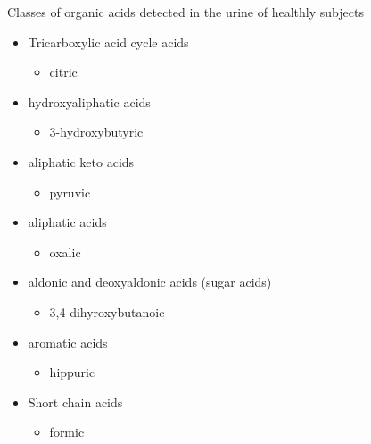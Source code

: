 \documentclass[presentation, smaller]{beamer}
\begin{document}
\begin{frame}[label={sec:orgheadline5}]{Classes of organic acids detected in the urine of  healthly subjects}
\begin{itemize}
\item Tricarboxylic acid cycle acids
\begin{itemize}
\item citric
\end{itemize}
\item hydroxyaliphatic acids
\begin{itemize}
\item 3-hydroxybutyric
\end{itemize}
\item aliphatic keto acids
\begin{itemize}
\item pyruvic
\end{itemize}
\item aliphatic acids
\begin{itemize}
\item oxalic
\end{itemize}
\item aldonic and deoxyaldonic acids (sugar acids)
\begin{itemize}
\item 3,4-dihyroxybutanoic
\end{itemize}
\item aromatic acids
\begin{itemize}
\item hippuric
\end{itemize}
\item Short chain acids
\begin{itemize}
\item formic
\end{itemize}
\end{itemize}
\end{frame}
\end{document}
